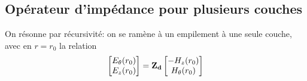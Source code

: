     \subsection{Opérateur d'impédance pour plusieurs couches}

        \begin{figure}[!hbt]
            \centering
            \begin{tikzpicture}
                
            \end{tikzpicture}
        \end{figure}

        On résonne par récursivité: on se ramène à un empilement à une seule couche, avec en $r=r_0$ la relation
        \begin{equation}
            \begin{bmatrix}
                E_\theta(r_0)\\
                E_z(r_0)\\
            \end{bmatrix}
            =
            \mat {Z_{d}} 
            \begin{bmatrix}
                -H_z(r_0)\\
                H_\theta(r_0)\\
            \end{bmatrix}
        \end{equation}

